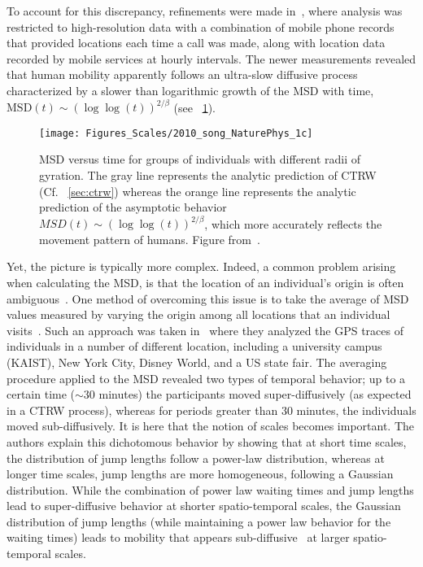 To account for this discrepancy, refinements were made in~\cite{song_2010_modelling}, where analysis was restricted to high-resolution data with a combination of mobile phone records that provided locations each time a call was made, along with location data recorded by mobile services at hourly intervals. The newer measurements revealed that human mobility apparently follows an ultra-slow diffusive process characterized by a slower than logarithmic growth of the MSD with time, $\mathrm{MSD}(t) \sim (\log \log(t))^{2/\beta}$ (see \figurename~\ref{fig:scales_song_2}). 

\begin{figure}[t!]
\centering
\texttt{[image: Figures\_Scales/2010\_song\_NaturePhys\_1c]}
\caption{MSD versus time for groups of individuals with different radii of gyration. The gray line represents the analytic prediction of CTRW (Cf. \sectionname~\ref{sec:ctrw}) whereas the orange line represents the analytic prediction of the asymptotic behavior $MSD(t) \sim (\log \log(t))^{2/\beta}$, which more accurately reflects the movement pattern of humans. Figure from~\cite{song_2010_modelling}.}
 \label{fig:scales_song_2}
\end{figure}

Yet, the picture is typically more complex. Indeed, a common problem arising when calculating the MSD, is that the location of an individual's origin is often ambiguous~\cite{shin_2008_levy}. One method of overcoming this issue is to take the average of MSD values measured by varying the origin among all locations that an individual visits~\cite{dimilla_1993_maximal, maruyama_2003_truncated}. Such an approach was taken in~\cite{shin_2008_levy} where they analyzed the GPS traces of individuals in a number of different location, including a university campus (KAIST), New York City, Disney World, and a US state fair. The averaging procedure applied to the MSD revealed two types of temporal behavior; up to a certain time ($\sim 30$ minutes) the participants moved super-diffusively (as expected in a CTRW process), whereas for periods greater than $30$ minutes, the individuals moved sub-diffusively. %
It is here that the notion of scales becomes important. The authors explain this dichotomous behavior by showing that at short time scales, the distribution of jump lengths follow a power-law distribution, whereas at longer time scales, jump lengths are more homogeneous, following a Gaussian distribution. While the combination of power law waiting times and jump lengths lead to super-diffusive behavior at shorter spatio-temporal scales, the Gaussian distribution of jump lengths (while maintaining a power law behavior for the waiting times) leads to mobility that appears sub-diffusive~\cite{vazquez_1999_diffusion} at larger spatio-temporal scales. 

